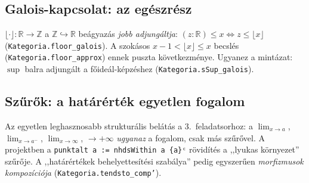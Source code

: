 \documentclass[11pt,a4paper]{article}
\newcommand{\lean}[1]{\texttt{\small #1}}
\newcommand{\R}{\mathbb{R}}
\newcommand{\Z}{\mathbb{Z}}
\theoremstyle{definition}
\begin{document}
\subsection{Galois-kapcsolat: az egészrész}

$\lfloor\cdot\rfloor : \R \to \Z$ a $\Z \hookrightarrow \R$ beágyazás
\emph{jobb adjungáltja}: $(z:\R) \le x \iff z \le \lfloor x\rfloor$
(\lean{Kategoria.floor\_galois}). A szokásos $x-1 < \lfloor x\rfloor \le x$
becslés (\lean{Kategoria.floor\_approx}) ennek puszta következménye.
Ugyanez a mintázat: $\sup$ balra adjungált a főideál-képzéshez
(\lean{Kategoria.sSup\_galois}).

\begin{center}
\end{center}

\subsection{Szűrők: a határérték egyetlen fogalom}

Az egyetlen leghasznosabb strukturális belátás a 3.~feladatsorhoz: a
$\lim_{x\to a}$, $\lim_{x\to a^-}$, $\lim_{x\to\infty}$, $\to +\infty$
\emph{ugyanaz} a fogalom, csak más szűrővel. A projektben a
\lean{punktalt a := nhdsWithin a \{a\}ᶜ} rövidítés a ,,lyukas környezet'' szűrője.
A ,,határértékek behelyettesítési szabálya'' pedig egyszerűen
\emph{morfizmusok kompozíciója} (\lean{Kategoria.tendsto\_comp'}).

\begin{center}
\end{center}
\end{document}
